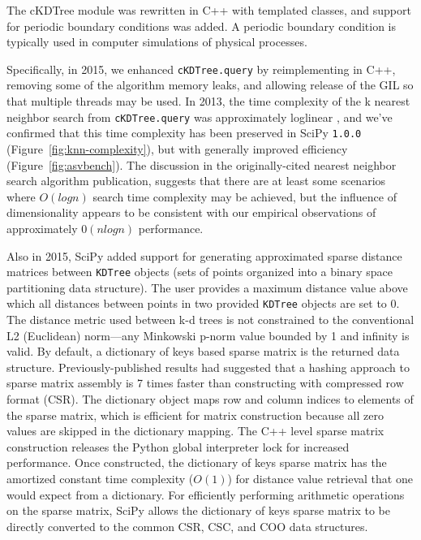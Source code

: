 The cKDTree module was rewritten in C++ with templated classes, and support for
periodic boundary conditions was added. A periodic boundary condition is typically 
used in computer simulations of physical processes.

Specifically, in 2015, we enhanced \texttt{cKDTree.query} by reimplementing in C++,
removing some of the algorithm memory leaks, and allowing 
release of the GIL so that multiple threads may be used\cite{gh-4374}. In 2013,
the time complexity of the k nearest neighbor search from \texttt{cKDTree.query}
was approximately loglinear \cite{knn-jake}, and we've confirmed that this time
complexity has been preserved in SciPy \texttt{1.0.0} (Figure~\ref{fig:knn-complexity}),
but with generally improved efficiency (Figure~\ref{fig:asvbench}). The
discussion in the originally-cited nearest neighbor search
algorithm publication\cite{kdtree-search-algo}, suggests that there are
at least some scenarios where $O(log n)$ search time complexity may
be achieved, but the influence of dimensionality appears to be consistent
with our empirical observations of approximately $0(n log n)$ performance.

Also in 2015, SciPy added support for generating approximated sparse distance matrices 
between \texttt{KDTree} objects (sets of points organized into a binary space 
partitioning data structure\cite{Bentley:1975:MBS:361002.361007}). 
The user provides a maximum distance value
above which all distances between points in two provided \texttt{KDTree} objects
are set to 0. The distance metric used between k-d trees is not constrained
to the conventional L2 (Euclidean) norm---any Minkowski p-norm value
bounded by 1 and infinity is valid. By default, a dictionary of keys
based sparse matrix is the returned data structure. Previously-published
results had suggested that a hashing approach to sparse matrix assembly
is 7 times faster than constructing with compressed row format (CSR)\cite{10.1007/978-3-540-75755-9_107}.
The dictionary object maps row and column indices to elements of the sparse matrix, which is
efficient for matrix construction because all zero values are skipped in
the dictionary mapping. The C++ level sparse matrix construction releases the Python
global interpreter lock for increased performance. Once constructed, the
dictionary of keys sparse matrix has the amortized constant time complexity 
($O(1)$) for distance value retrieval that one would expect from a 
dictionary\cite{Cormen:2001:IA:580470}. For efficiently performing arithmetic
operations on the sparse matrix, SciPy allows the dictionary of keys
sparse matrix to be directly converted to the common CSR, CSC, and COO
data structures.

